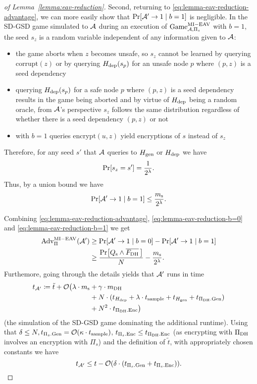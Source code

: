 \begin{proof}[of Lemma~\ref{lemma:eav-reduction}]
	Second, returning to \eqref{eq:lemma-eav-reduction-advantage}, we can more easily show that $\pr{\adv' \to 1 \mid b = 1}$ is negligible. In the SD-GSD game simulated to $\mathcal{A}$ during an execution of $\mathrm{Game}_{\mathcal{A}, \Pi_s}^{\mathrm{MI-EAV}}$ with $b = 1$, the seed $s_z$ is a random variable independent of any information given to $\mathcal{A}$:
	\begin{itemize}
		\item the game aborts when $z$ becomes unsafe, so $s_z$ cannot be learned by querying $\mathrm{corrupt}(z)$ or by querying $H_\mathrm{dep}(s_p)$ for an unsafe node $p$ where $(p, z)$ is a seed dependency
		\item querying $H_\mathrm{dep}(s_p)$ for a safe node $p$ where $(p, z)$ is a seed dependency results in the game being aborted and by virtue of $H_\mathrm{dep}$ being a random oracle, from $\mathcal{A}$'s perspective $s_z$ follows the same distribution regardless of whether there is a seed dependency $(p, z)$ or not
		\item with $b = 1$ queries $\mathrm{encrypt}(u, z)$ yield encryptions of $s$ instead of $s_z$
	\end{itemize}
	Therefore, for any seed $s'$ that $\mathcal{A}$ queries to $H_\mathrm{gen}$ or $H_\mathrm{dep}$ we have
	\[
		\pr{s_z = s'} = \frac{1}{2^\lambda}.
	\]
	Thus, by a union bound we have
	\begin{equation} \label{eq:lemma-eav-reduction-b=1}
		\pr{\adv' \to 1 \mid b = 1} \le \frac{\ms}{2^\lambda}.
	\end{equation}

	Combining \eqref{eq:lemma-eav-reduction-advantage}, \eqref{eq:lemma-eav-reduction-b=0} and \eqref{eq:lemma-eav-reduction-b=1} we get
	\begin{align} \label{eq:lemma-eav-reduction-advantage-lower-bound}
		\begin{split}
			\mathrm{Adv}_{\Pi}^{\mathrm{MI-EAV}}(\adv') & \ge \pr{\adv' \to 1 \mid b = 0} - \pr{\adv' \to 1 \mid b = 1}           \\
			& \ge \frac{\pr{\qs \land \overline{\fdh}\,}}{N} - \frac{\ms}{2^\lambda}.
		\end{split}
	\end{align}
	Furthemore, going through the details yields that $\mathcal{A}'$ runs in time
	\begin{align*}
		\begin{split}
			t_{\mathcal{A}'} \coloneqq \tilde{t} + \mathcal{O}\big(\lambda \cdot m_\mathrm{s} & +  \gamma \cdot m_\mathrm{DH}  \\
			& + N \cdot (t_{H_\mathrm{dep}} + \lambda \cdot t_{\mathrm{sample}} + t_{H_\mathrm{gen}} + t_{\Pi_{\mathrm{DH}}.\mathrm{Gen}})  \\
			& +  N^2 \cdot t_{\Pi_{\mathrm{DH}}.\mathrm{Enc}}\big)
		\end{split}
	\end{align*}
	(the simulation of the SD-GSD game dominating the additional runtime).
	Using that $\delta \le N, t_{\Pi_s.\mathrm{Gen}} = \mathcal{O}(\kappa \cdot t_{\mathrm{sample}})$, $t_{\Pi_s.\mathrm{Enc}} \le t_{\Pi_{\mathrm{DH}}.\mathrm{Enc}}$ (as encrypting with $\Pi_{\mathrm{DH}}$ involves an encryption with $\Pi_s$) and the definition of $\tilde{t}$, with appropriately chosen constants we have
	\[
		t_{\mathcal{A}'} \le t - \mathcal{O}(\delta \cdot (t_{\Pi_s.\mathrm{Gen}} + t_{\Pi_s.\mathrm{Enc}})).
	\]


\end{proof}
